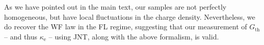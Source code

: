 As we have pointed out in the main text,  our samples are not perfectly homogeneous, but have local fluctuations in the charge density.   Nevertheless, we do recover the WF law in the FL regime, suggesting that our measurement of $G_{\mathrm{th}}$ -- and thus $\kappa_{\mathrm{e}}$ -- using JNT, along with the above formalism, is valid.

